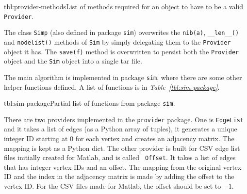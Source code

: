 \documentclass[12pt]{report}
\begin{document}
\begin{methodListC}{tbl:provider-methods}{List of methods required for an object
  to have to be a valid {\tt Provider}.}
\end{methodListC}


The class {\tt Simp} (also defined in package {\tt sim}) overwrites the
{\tt nib(a)}, {\tt \_\_len\_\_()} and {\tt nodelist()} methods of {\tt Sim} by
simply delegating them to the {\tt Provider} object it has. The {\tt save(f)}
method is overwritten to persist both the {\tt Provider} object and the
{\tt Sim} object into a single tar file.

The main algorithm is implemented in package {\tt sim}, where there are some
other helper functions defined. A list of functions is in
\emph{Table~\ref{tbl:sim-package}}.

\begin{methodListC}{tbl:sim-package}{Partial list of functions from package
  {\tt sim}.}
\end{methodListC}

There are two providers implemented in the {\tt provider} package. One is
{\tt EdgeList} and it takes a list of edges (as a Python array of tuples), it
generates a unique integer ID starting at 0 for each vertex and creates an
adjacency matrix. The mapping is kept as a Python dict. The other provider is
built for CSV edge list files initially created for Matlab, and is called {\tt
Offset}. It takes a list of edges that has integer vertex IDs and an offset.
The mapping from the original vertex ID and the index in the adjacency matrix is
made by adding the offset to the vertex ID. For the CSV files made for Matlab,
the offset should be set to $-1$.
\end{document}
